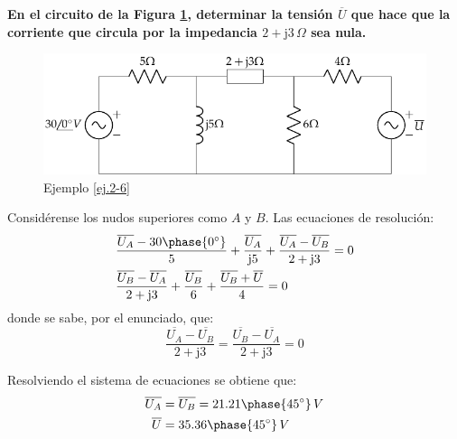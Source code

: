 \documentclass[11pt]{book} %
\begin{document}
	\vspace{4mm}
	\begin{example}\label{ej.2-6}
		\textbf{En el circuito de la Figura \ref{fig.ejercicio6_tema2}, determinar la tensión $\overline{U}$ que hace que la corriente que circula por la impedancia $2+\mathrm{j}3\,\Omega$ sea nula.}
		\begin{figure}[H]
			\centering
			\includegraphics[width=0.7\linewidth]{../figs/ej6_BT2.pdf}
			\caption{Ejemplo \ref{ej.2-6}}
			\label{fig.ejercicio6_tema2}
		\end{figure}
		
		Considérense los nudos superiores como $A$ y $B$. Las ecuaciones de resolución:
		\begin{align*}
		    & \dfrac{\overline{U_A}-30\phase{0^\circ}}{5}+\dfrac{\overline{U_A}}{\mathrm{j}5}+\dfrac{\overline{U_A}-\overline{U_B}}{2+\mathrm{j}3} = 0\\
		    & \dfrac{\overline{U_B}-\overline{U_A}}{2+\mathrm{j}3}+ \dfrac{\overline{U_B}}{6}+\dfrac{\overline{U_B}+\overline{U}}{4} = 0
		\end{align*}
		donde se sabe, por el enunciado, que:
		\begin{equation*}
		    \dfrac{\overline{U_A}-\overline{U_B}}{2+\mathrm{j}3}= \dfrac{\overline{U_B}-\overline{U_A}}{2+\mathrm{j}3} = 0
		\end{equation*}
		
		Resolviendo el sistema de ecuaciones se obtiene que:
		\begin{align*}
		    \overline{U_A}&=\overline{U_B}=21.21\phase{45^\circ}\,V\\
		    \overline{U}&=35.36\phase{45^\circ}\,V
		\end{align*}
		

\end{example}
\end{document}
